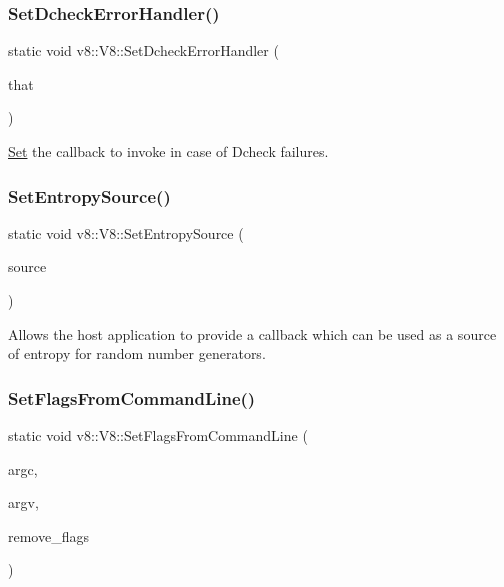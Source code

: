 \subsubsection{\texorpdfstring{Set\+Dcheck\+Error\+Handler()}{SetDcheckErrorHandler()}}
{\footnotesize\ttfamily static void v8\+::\+V8\+::\+Set\+Dcheck\+Error\+Handler (\begin{DoxyParamCaption}\item[{Dcheck\+Error\+Callback}]{that }\end{DoxyParamCaption})\hspace{0.3cm}{\ttfamily [static]}}

\mbox{\hyperlink{classv8_1_1Set}{Set}} the callback to invoke in case of Dcheck failures. \mbox{\label{classv8_1_1V8_a5331ce9c858af264f30de667c74c5a76}} 
\subsubsection{\texorpdfstring{Set\+Entropy\+Source()}{SetEntropySource()}}
{\footnotesize\ttfamily static void v8\+::\+V8\+::\+Set\+Entropy\+Source (\begin{DoxyParamCaption}\item[{\mbox{\hyperlink{namespacev8_ab699f4bbbb56350e6e915682e420fcdc}{Entropy\+Source}}}]{source }\end{DoxyParamCaption})\hspace{0.3cm}{\ttfamily [static]}}

Allows the host application to provide a callback which can be used as a source of entropy for random number generators. \mbox{\label{classv8_1_1V8_a63157ad9284ffad1c0ab62b21aadd08c}} 
\subsubsection{\texorpdfstring{Set\+Flags\+From\+Command\+Line()}{SetFlagsFromCommandLine()}}
{\footnotesize\ttfamily static void v8\+::\+V8\+::\+Set\+Flags\+From\+Command\+Line (\begin{DoxyParamCaption}\item[{int $\ast$}]{argc,  }\item[{char $\ast$$\ast$}]{argv,  }\item[{bool}]{remove\+\_\+flags }\end{DoxyParamCaption})\hspace{0.3cm}{\ttfamily [static]}}

